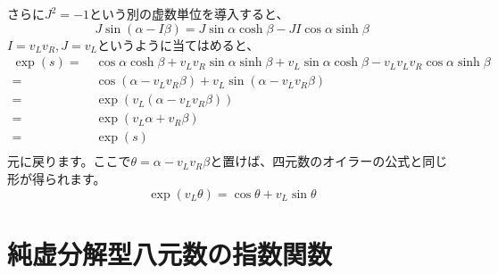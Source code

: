 \documentclass[a4paper,12pt,notitlepage]{jsreport}
\begin{document}
さらに$J^2=-1$という別の虚数単位を導入すると、
\begin{equation}
  J\sin(\alpha-I\beta)=J\sin\alpha\cosh\beta-JI\cos\alpha\sinh\beta
\end{equation}
$I=v_Lv_R,J=v_L$というように当てはめると、
\begin{equation}
  \begin{split}
    \exp(s)=~&\cos\alpha\cosh\beta+v_Lv_R\sin\alpha\sinh\beta+v_L\sin\alpha\cosh\beta-v_Lv_Lv_R\cos\alpha\sinh\beta\\
    =~&\cos(\alpha-v_Lv_R\beta)+v_L\sin(\alpha-v_Lv_R\beta)\\
    =~&\exp(v_L(\alpha-v_Lv_R\beta))\\
    =~&\exp(v_L\alpha+v_R\beta)\\
    =~&\exp(s)\\
  \end{split}
\end{equation}
元に戻ります。ここで$\theta=\alpha-v_Lv_R\beta$と置けば、四元数のオイラーの公式と同じ形が得られます。
\begin{equation}
  \exp(v_L\theta)=\cos\theta+v_L\sin\theta
\end{equation}

\section{純虚分解型八元数の指数関数}
\end{document}
